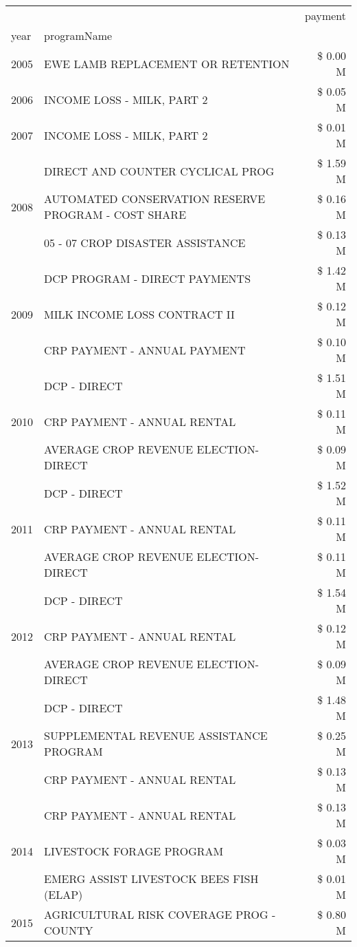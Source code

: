 \begin{tabular}{llr}
\toprule
 &  & payment \\
year & programName &  \\
\midrule
2005 & EWE LAMB REPLACEMENT OR RETENTION & \$ 0.00 M \\
\cline{1-3}
2006 & INCOME LOSS - MILK, PART 2 & \$ 0.05 M \\
\cline{1-3}
2007 & INCOME LOSS - MILK, PART 2 & \$ 0.01 M \\
\cline{1-3}
\multirow[t]{3}{*}{2008} & DIRECT AND COUNTER CYCLICAL PROG & \$ 1.59 M \\
 & AUTOMATED CONSERVATION RESERVE PROGRAM - COST SHARE & \$ 0.16 M \\
 & 05 - 07 CROP DISASTER ASSISTANCE & \$ 0.13 M \\
\cline{1-3}
\multirow[t]{3}{*}{2009} & DCP PROGRAM - DIRECT PAYMENTS & \$ 1.42 M \\
 & MILK INCOME LOSS CONTRACT II & \$ 0.12 M \\
 & CRP PAYMENT - ANNUAL PAYMENT & \$ 0.10 M \\
\cline{1-3}
\multirow[t]{3}{*}{2010} & DCP - DIRECT & \$ 1.51 M \\
 & CRP PAYMENT - ANNUAL RENTAL & \$ 0.11 M \\
 & AVERAGE CROP REVENUE ELECTION-DIRECT & \$ 0.09 M \\
\cline{1-3}
\multirow[t]{3}{*}{2011} & DCP - DIRECT & \$ 1.52 M \\
 & CRP PAYMENT - ANNUAL RENTAL & \$ 0.11 M \\
 & AVERAGE CROP REVENUE ELECTION-DIRECT & \$ 0.11 M \\
\cline{1-3}
\multirow[t]{3}{*}{2012} & DCP - DIRECT & \$ 1.54 M \\
 & CRP PAYMENT - ANNUAL RENTAL & \$ 0.12 M \\
 & AVERAGE CROP REVENUE ELECTION-DIRECT & \$ 0.09 M \\
\cline{1-3}
\multirow[t]{3}{*}{2013} & DCP - DIRECT & \$ 1.48 M \\
 & SUPPLEMENTAL REVENUE ASSISTANCE PROGRAM & \$ 0.25 M \\
 & CRP PAYMENT - ANNUAL RENTAL & \$ 0.13 M \\
\cline{1-3}
\multirow[t]{3}{*}{2014} & CRP PAYMENT - ANNUAL RENTAL & \$ 0.13 M \\
 & LIVESTOCK FORAGE PROGRAM & \$ 0.03 M \\
 & EMERG ASSIST LIVESTOCK BEES FISH (ELAP) & \$ 0.01 M \\
\cline{1-3}
\multirow[t]{3}{*}{2015} & AGRICULTURAL RISK COVERAGE PROG - COUNTY & \$ 0.80 M \\

\end{tabular}
